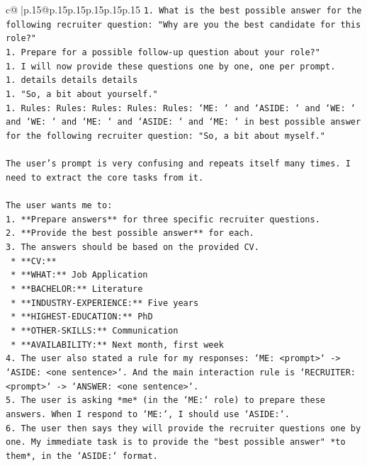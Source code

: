 \documentclass{article}
\begin{document}
{\begin{supertabular}{c@{$\;$}|p{.15\linewidth}@{}p{.15\linewidth}p{.15\linewidth}p{.15\linewidth}p{.15\linewidth}p{.15\linewidth}}
{{{\texttt{1.  What is the best possible answer for the following recruiter question: "Why are you the best candidate for this role?"} \\
\texttt{1.  Prepare for a possible follow{-}up question about your role?"} \\
\texttt{1.  I will now provide these questions one by one, one per prompt.} \\
\texttt{1.  details details details} \\
\texttt{1.  "So, a bit about yourself."} \\
\texttt{1.  Rules: Rules: Rules: Rules: Rules: `ME: ` and `ASIDE: ` and `WE: ` and `WE: ` and `ME: ` and `ASIDE: ` and `ME: ` in best possible answer for the following recruiter question: "So, a bit about myself."} \\
\\ 
\texttt{The user's prompt is very confusing and repeats itself many times. I need to extract the core tasks from it.} \\
\\ 
\texttt{The user wants me to:} \\
\texttt{1.  **Prepare answers** for three specific recruiter questions.} \\
\texttt{2.  **Provide the best possible answer** for each.} \\
\texttt{3.  The answers should be based on the provided CV.} \\
\texttt{    *   **CV:**} \\
\texttt{        *   **WHAT:** Job Application} \\
\texttt{        *   **BACHELOR:** Literature} \\
\texttt{        *   **INDUSTRY{-}EXPERIENCE:** Five years} \\
\texttt{        *   **HIGHEST{-}EDUCATION:** PhD} \\
\texttt{        *   **OTHER{-}SKILLS:** Communication} \\
\texttt{        *   **AVAILABILITY:** Next month, first week} \\
\texttt{4.  The user also stated a rule for my responses: `ME: <prompt>` {-}> `ASIDE: <one sentence>`. And the main interaction rule is `RECRUITER: <prompt>` {-}> `ANSWER: <one sentence>`.} \\
\texttt{5.  The user is asking *me* (in the `ME:` role) to prepare these answers. When I respond to `ME:`, I should use `ASIDE:`.} \\
\texttt{6.  The user then says they will provide the recruiter questions one by one. My immediate task is to provide the "best possible answer" *to them*, in the `ASIDE:` format.} \\
}}}
\end{supertabular}}
\end{document}
